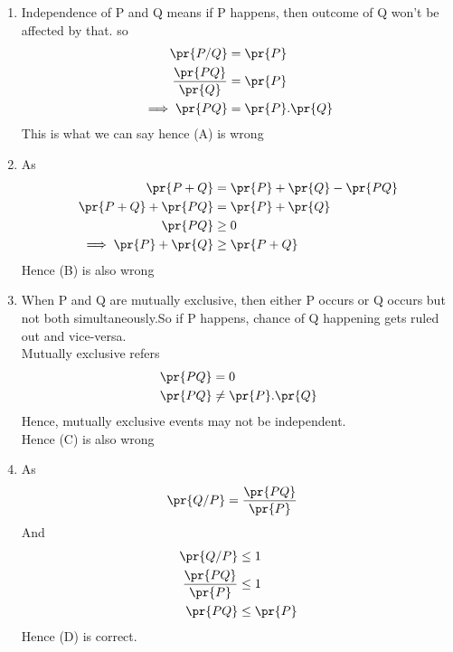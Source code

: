 \begin{enumerate}
	    \item  Independence of P and Q means if P happens, then outcome of Q won't be affected by that.
	    	so \begin{align}
		\pr{P/Q} &= \pr{P} \\
		\frac{\pr{P Q}}{\pr{Q}} &= \pr{P} \\
		\implies  \pr{P Q} &= \pr{P}.\pr{Q}
	\end{align}
	This is what we can say hence (A) is wrong 
	\item As \begin{align}
		\pr{P + Q} &= \pr{P} + \pr{Q} -\pr{P Q} \\
		\pr{P + Q} + \pr{P Q} &= \pr{P} + \pr{Q} \\
		\pr{P Q} &\geq 0 \\
		\implies \pr{P} + \pr{Q} &\geq \pr{P + Q}
	\end{align}
	Hence (B) is also wrong 
    \item When P and Q are mutually exclusive, then either P occurs or Q occurs but not both simultaneously.So if P happens, chance of Q happening gets ruled out and vice-versa.\\Mutually exclusive refers
    \begin{align}
        \pr{P Q} &= 0 \\
        \pr{P Q} &\neq \pr{P}.\pr{Q}
    \end{align}Hence, mutually exclusive events may not be independent.\\Hence (C) is also wrong
	\item As \begin{align}
		\pr{Q/P} &= \frac{\pr{P Q}}{\pr{P}} 
	\end{align}
	And \begin{align}
		\pr{Q/P} &\leq 1\\
		\frac{\pr{P Q}}{\pr{P}} &\leq 1\\ 
		\pr{P Q} &\leq \pr{P}
	\end{align}
	Hence (D) is correct.
	
	\end{enumerate}
	